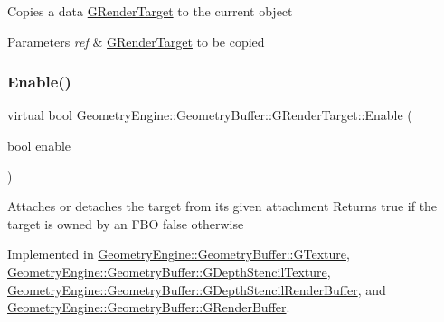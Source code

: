 Copies a data \mbox{\hyperlink{class_geometry_engine_1_1_geometry_buffer_1_1_g_render_target}{G\+Render\+Target}} to the current object 
\begin{DoxyParams}{Parameters}
{\em ref} & \mbox{\hyperlink{class_geometry_engine_1_1_geometry_buffer_1_1_g_render_target}{G\+Render\+Target}} to be copied \\
\hline
\end{DoxyParams}
\mbox{\label{class_geometry_engine_1_1_geometry_buffer_1_1_g_render_target_a1b8be750dfd13582d0730bf9e4c4e1d2}} 
\subsubsection{\texorpdfstring{Enable()}{Enable()}}
{\footnotesize\ttfamily virtual bool Geometry\+Engine\+::\+Geometry\+Buffer\+::\+G\+Render\+Target\+::\+Enable (\begin{DoxyParamCaption}\item[{bool}]{enable }\end{DoxyParamCaption})\hspace{0.3cm}{\ttfamily [pure virtual]}}

Attaches or detaches the target from its given attachment Returns true if the target is owned by an F\+BO false otherwise 

Implemented in \mbox{\hyperlink{class_geometry_engine_1_1_geometry_buffer_1_1_g_texture_a528604f22629785271b3f36ec18ffc78}{Geometry\+Engine\+::\+Geometry\+Buffer\+::\+G\+Texture}}, \mbox{\hyperlink{class_geometry_engine_1_1_geometry_buffer_1_1_g_depth_stencil_texture_a38a1f3219bddbab69fa338a727e0ab3a}{Geometry\+Engine\+::\+Geometry\+Buffer\+::\+G\+Depth\+Stencil\+Texture}}, \mbox{\hyperlink{class_geometry_engine_1_1_geometry_buffer_1_1_g_depth_stencil_render_buffer_ad5c121dac465229736e6159981b965cb}{Geometry\+Engine\+::\+Geometry\+Buffer\+::\+G\+Depth\+Stencil\+Render\+Buffer}}, and \mbox{\hyperlink{class_geometry_engine_1_1_geometry_buffer_1_1_g_render_buffer_afb80727ba33997fb7f48551de1831111}{Geometry\+Engine\+::\+Geometry\+Buffer\+::\+G\+Render\+Buffer}}.

\mbox{\label{class_geometry_engine_1_1_geometry_buffer_1_1_g_render_target_a42f43fba3fb8fe32e81509b5869c87e2}} 
